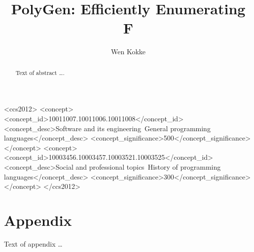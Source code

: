 \documentclass[sigplan,10pt,review,anonymous]{acmart}\settopmatter{printfolios=true,printccs=false,printacmref=false}
\begin{document}
\title{PolyGen: Efficiently Enumerating F\textomega}

\author{Wen Kokke}



\begin{abstract}
Text of abstract \ldots.
\end{abstract}


\begin{CCSXML}
<ccs2012>
<concept>
<concept_id>10011007.10011006.10011008</concept_id>
<concept_desc>Software and its engineering~General programming languages</concept_desc>
<concept_significance>500</concept_significance>
</concept>
<concept>
<concept_id>10003456.10003457.10003521.10003525</concept_id>
<concept_desc>Social and professional topics~History of programming languages</concept_desc>
<concept_significance>300</concept_significance>
</concept>
</ccs2012>
\end{CCSXML}




\maketitle






\appendix
\section{Appendix}

Text of appendix \ldots
\end{document}
